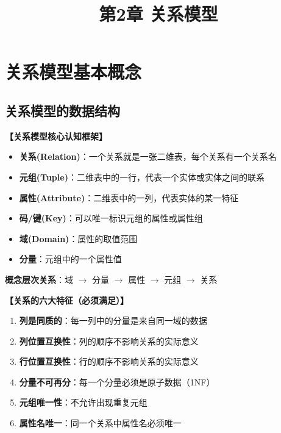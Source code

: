 \documentclass[12pt, a4paper]{article}
\title{\textbf{第2章 关系模型}}
\date{}
\newenvironment{bluebox}[1]{%
  \begin{trivlist}
  \item[\hskip\labelsep \textbf{#1}]
  \setlength{\parskip}{0.5ex}
  \setlength{\itemsep}{0.5ex}
}{%
  \end{trivlist}
}
\begin{document}
\maketitle
\thispagestyle{empty}
\newpage

\section{关系模型基本概念}

\subsection{关系模型的数据结构}

\begin{bluebox}{核心概念框架}
	\textbf{【关系模型核心认知框架】}

	\begin{itemize}[leftmargin=*, nosep]
		\item \textbf{关系(Relation)}：一个关系就是一张二维表，每个关系有一个关系名
		\item \textbf{元组(Tuple)}：二维表中的一行，代表一个实体或实体之间的联系
		\item \textbf{属性(Attribute)}：二维表中的一列，代表实体的某一特征
		\item \textbf{码/键(Key)}：可以唯一标识元组的属性或属性组
		\item \textbf{域(Domain)}：属性的取值范围
		\item \textbf{分量}：元组中的一个属性值
	\end{itemize}

	\textbf{概念层次关系}：域 $\rightarrow$ 分量 $\rightarrow$ 属性 $\rightarrow$ 元组 $\rightarrow$ 关系
\end{bluebox}

\begin{bluebox}{关系的基本特征}
	\textbf{【关系的六大特征（必须满足）】}

	\begin{enumerate}[leftmargin=*, label=\textbf{\arabic*.}]
		\item \textbf{列是同质的}：每一列中的分量是来自同一域的数据
		\item \textbf{列位置互换性}：列的顺序不影响关系的实际意义
		\item \textbf{行位置互换性}：行的顺序不影响关系的实际意义
		\item \textbf{分量不可再分}：每一个分量必须是原子数据（1NF）
		\item \textbf{元组唯一性}：不允许出现重复元组
		\item \textbf{属性名唯一}：同一个关系中属性名必须唯一
	\end{enumerate}
\end{bluebox}
\end{document}
